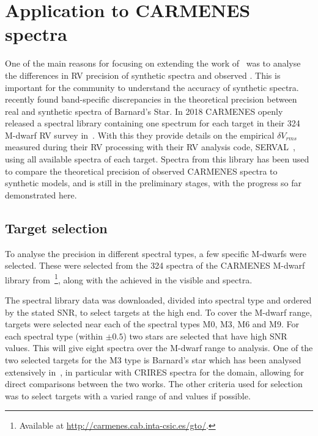 
\section{Application to {CARMENES} spectra}

One of the main reasons for focusing on extending the work of~\citet{figueira_radial_2016} was to analyse the differences in {RV} precision of synthetic spectra and observed \nir{}.
This is important for the community to understand the accuracy of synthetic spectra.
\citet{artigau_optical_2018} recently found band-specific discrepancies in the theoretical precision between real and synthetic \nir{} spectra of Barnard's Star.
In 2018 {CARMENES} openly released a spectral library containing one spectrum for each target in their 324 M-dwarf {RV} survey in~\citet{reiners_carmenes_2018}.
With this they provide details on the empirical \(\delta V_{rms}\) measured during their {RV} processing with their {RV} analysis code, {SERVAL}~\citep{zechmeister_spectrum_2018}, using all available spectra of each target.
Spectra from this library has been used to compare the theoretical precision of observed {CARMENES} spectra to synthetic models, and is still in the preliminary stages, with the progress so far demonstrated here.

\subsection{Target selection}
\label{subsec:carmense_targets}
To analyse the precision in different spectral types, a few specific M-dwarfs were selected.
These were selected from the 324 spectra of the {CARMENES} M-dwarf library from~\citet{reiners_carmenes_2018}\footnote{Available at \href{http://carmenes.cab.inta-csic.es/gto/}{\url{http://carmenes.cab.inta-csic.es/gto/}}.}, along with the achieved \snr{} in the visible and \nir{} spectra.

The spectral library data was downloaded, divided into spectral type and ordered by the stated \nir{} {SNR}, to select targets at the high \snr{} end.
To cover the M-dwarf range, targets were selected near each of the spectral types M0, M3, M6 and M9.
For each spectral type (within $\pm0.5$) two stars are selected that have high {SNR} values. This will give eight spectra over the M-dwarf range to analysis.
One of the two selected targets for the M3 type is Barnard's star which has been analysed extensively in~\citet{artigau_optical_2018}, in particular with CRIRES spectra for the \nir{} domain, allowing for direct comparisons between the two works.
The other criteria used for selection was to select targets with a varied range of \Logg{} and \feh{} values if possible.

